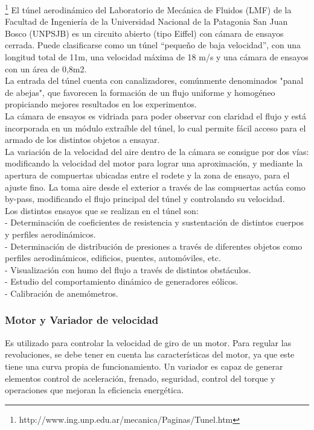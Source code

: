 \footnote{http://www.ing.unp.edu.ar/mecanica/Paginas/Tunel.htm} 
	El túnel aerodinámico del Laboratorio de Mecánica de Fluidos (LMF) de la Facultad de Ingeniería de la Universidad Nacional de la Patagonia San Juan Bosco (UNPSJB) es un circuito abierto (tipo Eiffel) con cámara de ensayos cerrada. Puede clasificarse como un túnel “pequeño de baja velocidad”, con una longitud total de 11m, una velocidad máxima de 18 m/s y una cámara de ensayos con un área de 0,8m2.
	\\
	La entrada del túnel cuenta con canalizadores, comúnmente denominados "panal de abejas", que favorecen la formación de un flujo uniforme y homogéneo propiciando mejores resultados en los experimentos.
	\\
	La cámara de ensayos es vidriada para poder observar con claridad el flujo y está incorporada en un módulo extraíble del túnel, lo cual permite fácil acceso para el armado de los distintos objetos a ensayar.
	\\
	La variación de la velocidad del aire dentro de la cámara se consigue por dos vías: modificando la velocidad del motor para lograr una aproximación, y mediante la apertura de compuertas ubicadas entre el rodete y la zona de ensayo, para el ajuste fino. La toma aire desde el exterior a través de las compuertas actúa como by-pass, modificando el flujo principal del túnel y controlando su velocidad.
	\\
	Los distintos ensayos que se realizan en el túnel son:
	\\
	- Determinación de coeficientes de resistencia y sustentación de distintos cuerpos y perfiles aerodinámicos. \\
	- Determinación de distribución de presiones a través de diferentes objetos como perfiles aerodinámicos, edificios, puentes, automóviles, etc. \\
	- Visualización con humo del flujo a través de distintos obstáculos. \\
	- Estudio del comportamiento dinámico de generadores eólicos. \\
	- Calibración de anemómetros. 
	\\
		\subsubsection{Motor y Variador de velocidad}
		\begin{tcolorbox}[colback=blue!5!white,colframe=blue!75!black,title=Variador de velocidad]
			Es utilizado para controlar la velocidad de giro de un motor. Para regular las revoluciones, se debe tener en cuenta las características del motor, ya que este tiene  una  curva  propia  de  funcionamiento.  Un  variador  es  capaz  de  generar elementos  control  de  aceleración,  frenado,  seguridad,  control  del  torque  y operaciones que mejoran la eficiencia energética.\end{tcolorbox}	

